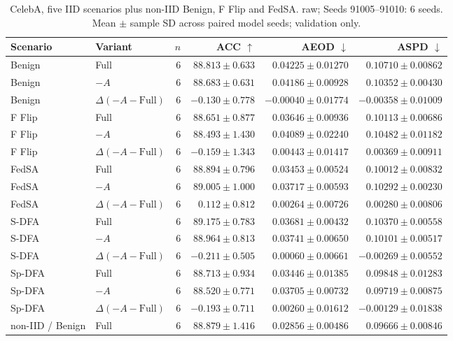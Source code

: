 \begin{table}[t]
\centering
\small
\caption{CelebA, five IID scenarios plus non-IID Benign, F Flip and FedSA. raw; Seeds 91005–91010: 6 seeds. Mean $\pm$ sample SD across paired model seeds; validation only.}
\begin{tabular}{llrrrr}
\toprule
Scenario & Variant & $n$ & ACC $\uparrow$ & AEOD $\downarrow$ & ASPD $\downarrow$ \\
\midrule
Benign & Full & 6 & $88.813 \pm 0.633$ & $0.04225 \pm 0.01270$ & $0.10710 \pm 0.00862$ \\
Benign & $-A$ & 6 & $88.683 \pm 0.631$ & $0.04186 \pm 0.00928$ & $0.10352 \pm 0.00430$ \\
Benign & $\Delta(-A-\mathrm{Full})$ & 6 & $-0.130 \pm 0.778$ & $-0.00040 \pm 0.01774$ & $-0.00358 \pm 0.01009$ \\
F Flip & Full & 6 & $88.651 \pm 0.877$ & $0.03646 \pm 0.00936$ & $0.10113 \pm 0.00686$ \\
F Flip & $-A$ & 6 & $88.493 \pm 1.430$ & $0.04089 \pm 0.02240$ & $0.10482 \pm 0.01182$ \\
F Flip & $\Delta(-A-\mathrm{Full})$ & 6 & $-0.159 \pm 1.343$ & $0.00443 \pm 0.01417$ & $0.00369 \pm 0.00911$ \\
FedSA & Full & 6 & $88.894 \pm 0.796$ & $0.03453 \pm 0.00524$ & $0.10012 \pm 0.00832$ \\
FedSA & $-A$ & 6 & $89.005 \pm 1.000$ & $0.03717 \pm 0.00593$ & $0.10292 \pm 0.00230$ \\
FedSA & $\Delta(-A-\mathrm{Full})$ & 6 & $0.112 \pm 0.812$ & $0.00264 \pm 0.00726$ & $0.00280 \pm 0.00806$ \\
S-DFA & Full & 6 & $89.175 \pm 0.783$ & $0.03681 \pm 0.00432$ & $0.10370 \pm 0.00558$ \\
S-DFA & $-A$ & 6 & $88.964 \pm 0.813$ & $0.03741 \pm 0.00650$ & $0.10101 \pm 0.00517$ \\
S-DFA & $\Delta(-A-\mathrm{Full})$ & 6 & $-0.211 \pm 0.505$ & $0.00060 \pm 0.00661$ & $-0.00269 \pm 0.00552$ \\
Sp-DFA & Full & 6 & $88.713 \pm 0.934$ & $0.03446 \pm 0.01385$ & $0.09848 \pm 0.01283$ \\
Sp-DFA & $-A$ & 6 & $88.520 \pm 0.771$ & $0.03705 \pm 0.00732$ & $0.09719 \pm 0.00875$ \\
Sp-DFA & $\Delta(-A-\mathrm{Full})$ & 6 & $-0.193 \pm 0.711$ & $0.00260 \pm 0.01612$ & $-0.00129 \pm 0.01838$ \\
non-IID / Benign & Full & 6 & $88.879 \pm 1.416$ & $0.02856 \pm 0.00486$ & $0.09666 \pm 0.00846$ \\

\end{tabular}
\end{table}
